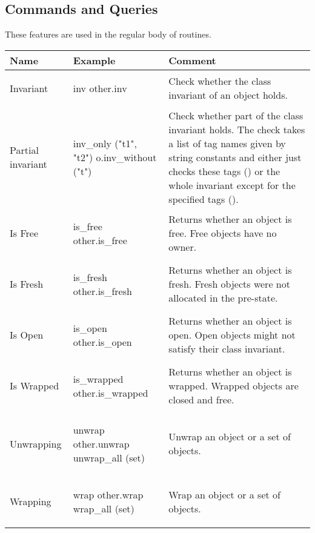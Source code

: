 \subsection{Commands and Queries}

These features are used in the regular body of routines.

\noindent
\begin{longtable}{|m{2.5cm}|l|m{6cm}|}
\hline
\textbf{Name} & \textbf{Example} & \textbf{Comment} \\ \endhead  \hline

Invariant &
{\begin{erunning}
inv
other.inv
\end{erunning}} &
Check whether the class invariant of an object holds.
\\ \hline

Partial \newline invariant &
{\begin{erunning}
inv_only ("t1", "t2")
o.inv_without ("t")
\end{erunning}} &
Check whether part of the class invariant holds. The check takes a list of tag names given by string constants and either just checks these tags (\e{inv_only}) or the whole invariant except for the specified tags (\e{inv_without}).
\\ \hline

Is Free &
{\begin{erunning}
is_free
other.is_free
\end{erunning}} &
Returns whether an object is free. Free objects have no owner.
\\ \hline

Is Fresh &
{\begin{erunning}
is_fresh
other.is_fresh
\end{erunning}} &
Returns whether an object is fresh. Fresh objects were not allocated in the pre-state.
\\ \hline

Is Open &
{\begin{erunning}
is_open
other.is_open
\end{erunning}} &
Returns whether an object is open. Open objects might not satisfy their class invariant.
\\ \hline

Is Wrapped &
{\begin{erunning}
is_wrapped
other.is_wrapped
\end{erunning}} &
Returns whether an object is wrapped. Wrapped objects are closed and free.
\\ \hline

Unwrapping &
{\begin{erunning}
unwrap
other.unwrap
unwrap_all (set)
\end{erunning}} &
Unwrap an object or a set of objects.
\\ \hline

Wrapping &
{\begin{erunning}
wrap
other.wrap
wrap_all (set)
\end{erunning}} &
Wrap an object or a set of objects.
\\ \hline

\end{longtable}

